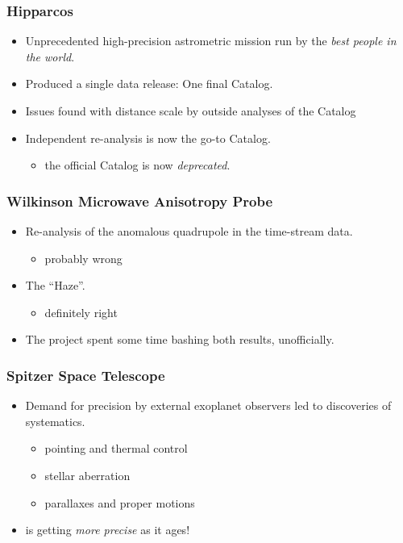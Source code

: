 \documentclass[pdftex]{beamer}
\begin{document}
\begin{frame}
  \frametitle{Hipparcos}
  \begin{itemize}
  \item Unprecedented high-precision astrometric mission run by the \emph{best people in the world}.
  \item Produced a single data release: One final Catalog.
  \item Issues found with distance scale by outside analyses of the Catalog
  \item Independent re-analysis is now the go-to Catalog.
    \begin{itemize}
    \item the official  Catalog is now \emph{deprecated}.
    \end{itemize}
  \end{itemize}
\end{frame}

\begin{frame}
  \frametitle{Wilkinson Microwave Anisotropy Probe}
  \begin{itemize}
  \item Re-analysis of the anomalous quadrupole in the time-stream data.
    \begin{itemize}
    \item probably wrong
    \end{itemize}
  \item The ``Haze''.
    \begin{itemize}
    \item definitely right
    \end{itemize}
  \item The project spent some time bashing both results, unofficially.
  \end{itemize}
\end{frame}

\begin{frame}
  \frametitle{Spitzer Space Telescope}
  \begin{itemize}
  \item Demand for precision by external exoplanet observers led to discoveries of systematics.
    \begin{itemize}
    \item pointing and thermal control
    \item stellar aberration
    \item parallaxes and proper motions
    \end{itemize}
  \item {} is getting \emph{more precise} as it ages!
  \end{itemize}
\end{frame}
\end{document}
